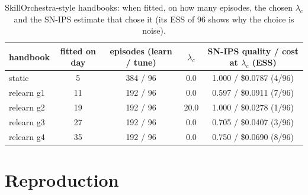 \documentclass[10pt]{article}
\begin{document}
\begin{table}[H]
\centering\footnotesize
\caption{SkillOrchestra-style handbooks: when fitted, on how many episodes, the chosen $\lambda_c$ and the SN-IPS estimate that chose it (its ESS of 96 shows why the choice is noise).}
\begin{tabular}{lcccc}
\toprule
handbook & fitted on day & episodes (learn / tune) & $\lambda_c$ & SN-IPS quality / cost at $\lambda_c$ (ESS) \\
\midrule
static & 5 & 384 / 96 & 0.0 & 1.000 / \$0.0787 (4/96) \\
relearn g1 & 11 & 192 / 96 & 0.0 & 0.597 / \$0.0911 (7/96) \\
relearn g2 & 19 & 192 / 96 & 20.0 & 1.000 / \$0.0278 (1/96) \\
relearn g3 & 27 & 192 / 96 & 0.0 & 0.705 / \$0.0407 (3/96) \\
relearn g4 & 35 & 192 / 96 & 0.0 & 0.750 / \$0.0690 (8/96) \\
\bottomrule
\end{tabular}
\end{table}

\section{Reproduction}
\label{app:repro}
\end{document}
